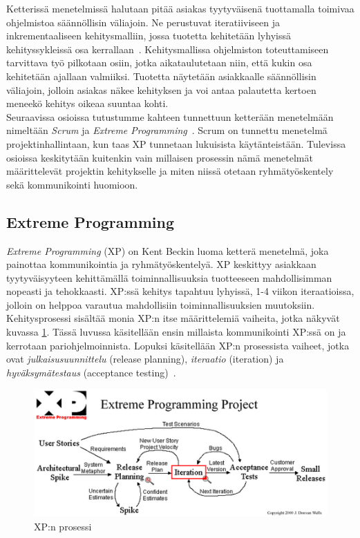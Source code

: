 \documentclass[finnish]{../tktltiki2}
\theoremstyle{definition}
\theoremstyle{remark}
\begin{document}
Ketterissä menetelmissä halutaan pitää asiakas tyytyväisenä tuottamalla toimivaa
ohjelmistoa säännöllisin väliajoin. Ne perustuvat iteratiiviseen ja inkrementaaliseen kehitysmalliin, jossa tuotetta kehitetään lyhyissä kehityssykleissä osa kerrallaan~\cite{Cockburn:2008}. Kehitysmallissa ohjelmiston toteuttamiseen tarvittava työ pilkotaan osiin, jotka aikataulutetaan niin, että kukin osa kehitetään ajallaan valmiiksi. Tuotetta näytetään asiakkaalle säännöllisin väliajoin, jolloin asiakas näkee kehityksen ja voi antaa palautetta kertoen meneekö kehitys oikeaa suuntaa kohti.\\

Seuraavissa osioissa tutustumme kahteen tunnettuun
ketterään menetelmään nimeltään \emph{Scrum} ja \emph{Extreme Programming}~\cite{ScrumFinnishGuide,Beck:2004:EPE:1076267,Scrumprimer,ScrumHandBook}. Scrum on tunnettu menetelmä projektinhallintaan, kun taas XP tunnetaan lukuisista käytänteistään. Tulevissa osioissa keskitytään kuitenkin vain millaisen prosessin nämä menetelmät
määrittelevät projektin kehitykselle ja miten niissä otetaan ryhmätyöskentely sekä kommunikointi huomioon.

\subsection{Extreme Programming}

\emph{Extreme Programming} (XP) on Kent Beckin luoma ketterä menetelmä, joka painottaa kommunikointia ja ryhmätyöskentelyä. XP keskittyy asiakkaan tyytyväisyyteen kehittämällä toiminnallisuuksia
tuotteeseen mahdollisimman nopeasti ja tehokkaasti. XP:ssä kehitys tapahtuu lyhyissä, 1-4 viikon iteraatioissa, jolloin on helppoa varautua mahdollisiin
toiminnallisuuksien muutoksiin. Kehitysprosessi sisältää monia XP:n itse määrittelemiä vaiheita, jotka
näkyvät kuvassa \ref{xprocess}. Tässä luvussa käsitellään ensin millaista kommunikointi XP:ssä on ja kerrotaan pariohjelmoinnista. Lopuksi
käsitellään XP:n prosessista vaiheet, jotka ovat \emph{julkaisusuunnittelu} (release planning), \emph{iteraatio} (iteration) ja \emph{hyväksymätestaus} (acceptance testing)~\cite{XP.ORG}.

\begin{figure}[ht]
     \includegraphics[width=12cm]{xp.png}
     \caption{XP:n prosessi~\cite{XP.ORGMAP}}\label{xprocess}
\end{figure}
\end{document}
